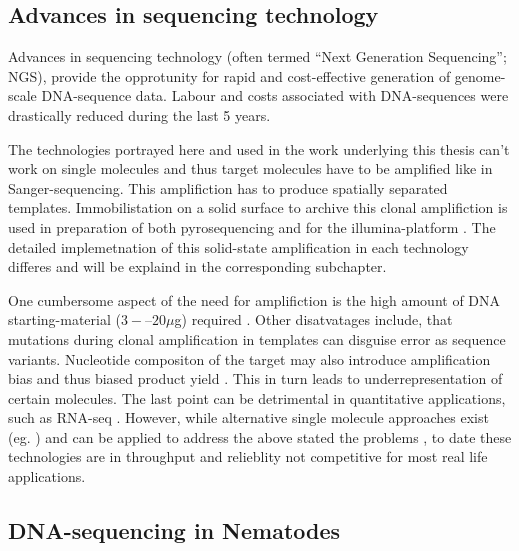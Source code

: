 \subsection{Advances in sequencing technology}
\label{sec:ad-seq}

Advances in sequencing technology (often termed ``Next Generation
Sequencing''; NGS), provide the opprotunity for rapid and
cost-effective generation of genome-scale DNA-sequence data.  Labour
and costs associated with DNA-sequences were drastically reduced
during the last 5 years.



The technologies portrayed here and used in the work underlying this
thesis can't work on single molecules and thus target molecules have
to be amplified like in Sanger-sequencing. This amplifiction has to
produce spatially separated templates. Immobilistation on a solid
surface to archive this clonal amplifiction is used in preparation of
both pyrosequencing and for the illumina-platform
\cite{pmid19997069}. The detailed implemetnation of this solid-state
amplification in each technology differes and will be explaind in the
corresponding subchapter.

One cumbersome aspect of the need for amplifiction is the high amount
of DNA starting-material ($3 -– 20 \mu$g) required
\cite{pmid19997069}. Other disatvatages include, that mutations during
clonal amplification in templates can disguise error as sequence
variants. Nucleotide compositon of the target may also introduce
amplification bias and thus biased product yield
\cite{pmid19327155}. This in turn leads to underrepresentation of
certain molecules. The last point can be detrimental in quantitative
applications, such as RNA-seq \cite{pmid19015660}. However, while
alternative single molecule approaches exist (eg. \cite{pmid21431759,
  pmid21572978}) and can be applied to address the above stated the
problems \cite{pmid21431761, pmid21957044}, to date these technologies
are in throughput and relieblity not competitive for most real life
applications.


\subsection{DNA-sequencing in Nematodes}
\label{sec:dna-sequ-nemat}

